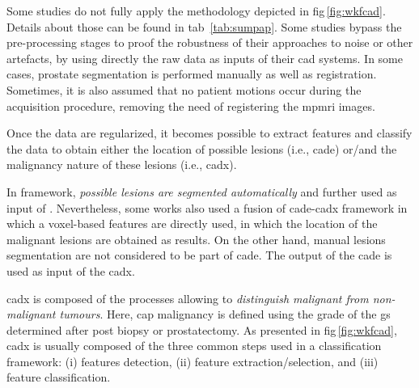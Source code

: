 Some studies do not fully apply the methodology depicted in \acs{fig}\,\ref{fig:wkfcad}.
Details about those can be found in \acs{tab}~\ref{tab:sumpap}.
Some studies bypass the pre-processing stages to proof the robustness of their approaches to noise or other artefacts, by using directly the raw data as inputs of their \ac{cad} systems.
In some cases, prostate segmentation is performed manually as well as registration.
Sometimes, it is also assumed that no patient motions occur during the acquisition procedure, removing the need of registering the \ac{mpmri} images.

Once the data are regularized, it becomes possible to extract features and classify the data to obtain either the location of possible lesions (i.e., \ac{cade}) or/and the malignancy nature of these lesions (i.e., \ac{cadx}).

In  framework, \textit{possible lesions are segmented automatically} and further used as input of .
Nevertheless, some works also used a fusion of \ac{cade}-\ac{cadx} framework in which a voxel-based features are directly used, in which the location of the malignant lesions are obtained as results.
On the other hand, manual lesions segmentation are not considered to be part of \ac{cade}.
The output of the \ac{cade} is used as input of the \ac{cadx}.

\Ac{cadx} is composed of the processes allowing to \textit{distinguish malignant from non-malignant tumours}.
Here, \ac{cap} malignancy is defined using the grade of the \ac{gs} determined after post biopsy or prostatectomy.
As presented in \ac{fig}\,\ref{fig:wkfcad}, \ac{cadx} is usually composed of the three common steps used in a classification framework: (i) features detection, (ii) feature extraction/selection, and (iii) feature classification.



